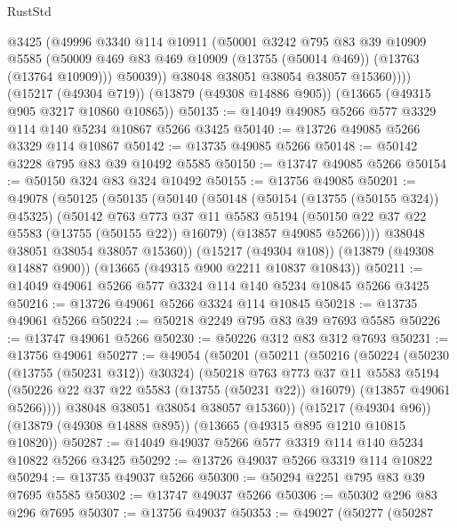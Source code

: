 \begin{lexlean}{RustStd}
\begin{coremodule}
            @3425
            (@49996
              @3340
              @114
              @10911
              (@50001
                @3242
                @795
                @83
                @39
                @10909
                @5585
                (@50009 @469 @83 @469 @10909 (@13755 (@50014 @469)) (@13763 (@13764 @10909)))
                @50039))
            @38048
            @38051
            @38054
            @38057
            @15360))))
    (@15217 (@49304 @719))
    (@13879 (@49308 @14886 @905))
    (@13665 (@49315 @905 @3217 @10860 @10865))
@50135 := @14049 @49085 @5266 @577 @3329 @114 @140 @5234 @10867 @5266 @3425
@50140 := @13726 @49085 @5266 @3329 @114 @10867
@50142 := @13735 @49085 @5266
@50148 := @50142 @3228 @795 @83 @39 @10492 @5585
@50150 := @13747 @49085 @5266
@50154 := @50150 @324 @83 @324 @10492
@50155 := @13756 @49085
@50201 := @49078
    (@50125
      (@50135
        (@50140
          (@50148
            (@50154 (@13755 (@50155 @324)) @45325)
            (@50142
              @763
              @773
              @37
              @11
              @5583
              @5194
              (@50150 @22 @37 @22 @5583 (@13755 (@50155 @22)) @16079)
              (@13857 @49085 @5266))))
        @38048
        @38051
        @38054
        @38057
        @15360))
    (@15217 (@49304 @108))
    (@13879 (@49308 @14887 @900))
    (@13665 (@49315 @900 @2211 @10837 @10843))
@50211 := @14049 @49061 @5266 @577 @3324 @114 @140 @5234 @10845 @5266 @3425
@50216 := @13726 @49061 @5266 @3324 @114 @10845
@50218 := @13735 @49061 @5266
@50224 := @50218 @2249 @795 @83 @39 @7693 @5585
@50226 := @13747 @49061 @5266
@50230 := @50226 @312 @83 @312 @7693
@50231 := @13756 @49061
@50277 := @49054
    (@50201
      (@50211
        (@50216
          (@50224
            (@50230 (@13755 (@50231 @312)) @30324)
            (@50218
              @763
              @773
              @37
              @11
              @5583
              @5194
              (@50226 @22 @37 @22 @5583 (@13755 (@50231 @22)) @16079)
              (@13857 @49061 @5266))))
        @38048
        @38051
        @38054
        @38057
        @15360))
    (@15217 (@49304 @96))
    (@13879 (@49308 @14888 @895))
    (@13665 (@49315 @895 @1210 @10815 @10820))
@50287 := @14049 @49037 @5266 @577 @3319 @114 @140 @5234 @10822 @5266 @3425
@50292 := @13726 @49037 @5266 @3319 @114 @10822
@50294 := @13735 @49037 @5266
@50300 := @50294 @2251 @795 @83 @39 @7695 @5585
@50302 := @13747 @49037 @5266
@50306 := @50302 @296 @83 @296 @7695
@50307 := @13756 @49037
@50353 := @49027
    (@50277
      (@50287

\end{coremodule}
\end{lexlean}
